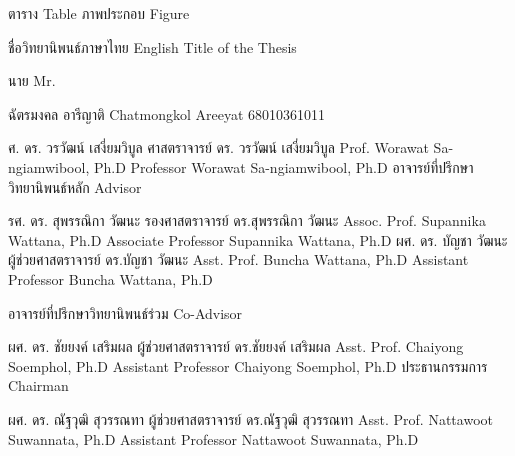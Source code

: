 


\def\MSUfontThai{16}      %
\def\MSUfontEnglish{12}   %

\headinglist
{ตาราง}
{Table}
{ภาพประกอบ}
{Figure}


\thesistitles
{ชื่อวิทยานิพนธ์ภาษาไทย}            %
{English Title of the Thesis}   %

\authorprefix
{นาย}
{Mr.}

\thesisauthor
{ฉัตรมงคล อารีญาติ}
{Chatmongkol Areeyat}
{68010361011}

\advisor
{ศ. ดร. วรวัฒน์ เสงี่ยมวิบูล}
{ศาสตราจารย์ ดร. วรวัฒน์ เสงี่ยมวิบูล}
{Prof. Worawat Sa-ngiamwibool, Ph.D}
{Professor Worawat Sa-ngiamwibool, Ph.D}
{อาจารย์ที่ปรึกษาวิทยานิพนธ์หลัก}
{Advisor}

\coadvisorlist
{รศ. ดร. สุพรรณิกา วัฒนะ}
{รองศาสตราจารย์ ดร.สุพรรณิกา วัฒนะ}
{Assoc. Prof. Supannika Wattana, Ph.D}
{Associate Professor Supannika Wattana, Ph.D}
{ผศ. ดร. บัญชา วัฒนะ}
{ผู้ช่วยศาสตราจารย์ ดร.บัญชา วัฒนะ}
{Asst. Prof. Buncha Wattana, Ph.D}
{Assistant Professor Buncha Wattana, Ph.D}

\coadvisorName
{อาจารย์ที่ปรึกษาวิทยานิพนธ์ร่วม}
{Co-Advisor}

\committeeChair
{ผศ. ดร. ชัยยงค์ เสริมผล}
{ผู้ช่วยศาสตราจารย์ ดร.ชัยยงค์ เสริมผล}
{Asst. Prof. Chaiyong Soemphol, Ph.D}
{Assistant Professor Chaiyong Soemphol, Ph.D}
{ประธานกรรมการ}
{Chairman}

\committeelist  
{ผศ. ดร. ณัฐวุฒิ สุวรรณทา}
{ผู้ช่วยศาสตราจารย์ ดร.ณัฐวุฒิ สุวรรณทา}
{Asst. Prof. Nattawoot Suwannata, Ph.D}
{Assistant Professor Nattawoot Suwannata, Ph.D}
%
{}
{}
{}
{}

